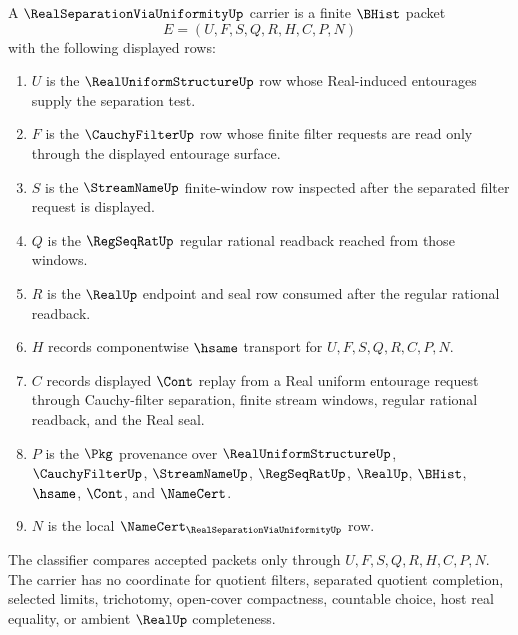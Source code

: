 \begin{definition}
\label{def:real-separation-via-uniformity-carrier}
A $\RealSeparationViaUniformityUp$ carrier is a finite $\BHist$ packet
$$
E=(U,F,S,Q,R,H,C,P,N)
$$
with the following displayed rows:
\begin{enumerate}
\item $U$ is the $\RealUniformStructureUp$ row whose Real-induced entourages supply the separation test.
\item $F$ is the $\CauchyFilterUp$ row whose finite filter requests are read only through the displayed entourage surface.
\item $S$ is the $\StreamNameUp$ finite-window row inspected after the separated filter request is displayed.
\item $Q$ is the $\RegSeqRatUp$ regular rational readback reached from those windows.
\item $R$ is the $\RealUp$ endpoint and seal row consumed after the regular rational readback.
\item $H$ records componentwise $\hsame$ transport for $U,F,S,Q,R,C,P,N$.
\item $C$ records displayed $\Cont$ replay from a Real uniform entourage request through Cauchy-filter separation, finite stream windows, regular rational readback, and the Real seal.
\item $P$ is the $\Pkg$ provenance over $\RealUniformStructureUp$, $\CauchyFilterUp$, $\StreamNameUp$, $\RegSeqRatUp$, $\RealUp$, $\BHist$, $\hsame$, $\Cont$, and $\NameCert$.
\item $N$ is the local $\NameCert_{\RealSeparationViaUniformityUp}$ row.
\end{enumerate}
The classifier compares accepted packets only through $U,F,S,Q,R,H,C,P,N$. The carrier has no coordinate for quotient filters, separated quotient completion, selected limits, trichotomy, open-cover compactness, countable choice, host real equality, or ambient $\RealUp$ completeness.
\end{definition}

